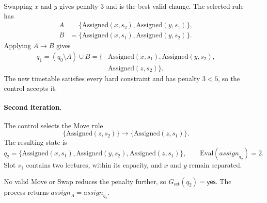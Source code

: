 Swapping $x$ and $y$ gives penalty 3 and is the best
valid change. The selected rule has
\[
\begin{aligned}
A&=\{\mathrm{Assigned}(x,s_2),
     \mathrm{Assigned}(y,s_1)\},\\
B&=\{\mathrm{Assigned}(x,s_1),
     \mathrm{Assigned}(y,s_2)\}.
\end{aligned}
\]
Applying $A\to B$ gives
\[
\begin{aligned}
q_1=(q_0\setminus A)\cup B
=\{&\mathrm{Assigned}(x,s_1),
    \mathrm{Assigned}(y,s_2),\\
   &\mathrm{Assigned}(z,s_2)\}.
\end{aligned}
\]
The new timetable satisfies every hard constraint and
has penalty $3<5$, so the control accepts it.

\paragraph{Second iteration.}
The control selects the Move rule
\[
\{\mathrm{Assigned}(z,s_2)\}
\longrightarrow
\{\mathrm{Assigned}(z,s_1)\}.
\]
The resulting state is
\[
q_2=
\{\mathrm{Assigned}(x,s_1),
  \mathrm{Assigned}(y,s_2),
  \mathrm{Assigned}(z,s_1)\},
\qquad
\mathrm{Eval}(\mathit{assign}_{q_2})=2.
\]
Slot $s_1$ contains two lectures, within its capacity,
and $x$ and $y$ remain separated.

No valid Move or Swap reduces the penalty further,
so $G_{\mathrm{set}}(q_2)=\mathsf{yes}$.
The process returns
$\mathit{assign}_A=\mathit{assign}_{q_2}$.
